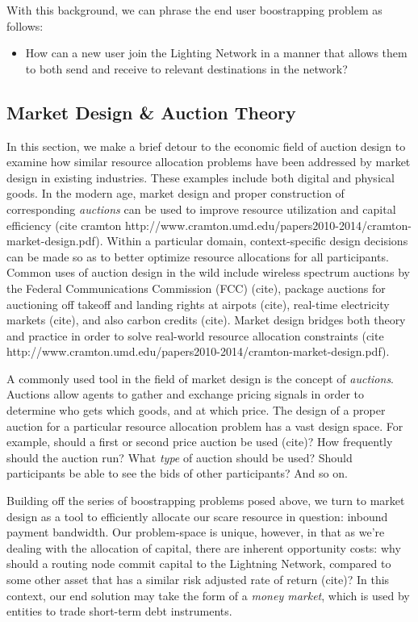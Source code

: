 \documentclass[10pt,a4paper]{article}
\theoremstyle{definition}
\begin{document}
With this background, we can phrase the end user boostrapping problem as
follows: 

\begin{itemize}
        \item How can a new user join the Lighting Network in a manner that allows them to
            both send and receive to relevant destinations in the network? 
\end{itemize}


\subsection{Market Design \& Auction Theory}

In this section, we make a brief detour to the economic field of auction design
to examine how similar resource allocation problems have been addressed by
market design in existing industries. These examples include both digital and physical goods. In
the modern age, market design and proper construction of corresponding
\emph{auctions} can be used to improve resource utilization and capital
efficiency (cite cramton
http://www.cramton.umd.edu/papers2010-2014/cramton-market-design.pdf). 
Within a particular domain, context-specific
design decisions can be made so as to better optimize resource allocations for all
participants. Common uses of auction design in the wild include
wireless spectrum auctions by the Federal Communications Commission (FCC)
(cite), package auctions for auctioning off takeoff and landing rights at
airpots (cite), real-time electricity markets (cite), and also carbon credits
(cite). Market design bridges both theory and practice in order to solve
real-world resource allocation constraints (cite
http://www.cramton.umd.edu/papers2010-2014/cramton-market-design.pdf). 


A commonly used tool in the field of market design is the concept of \emph{auctions}.
Auctions allow agents to gather and exchange pricing signals in order to determine
who gets which goods, and at which price. The design of a proper auction for a
particular resource allocation problem has a vast design space. For example,
should a first or second price auction be used (cite)? How frequently should
the auction run? What \emph{type} of auction should be used? Should
participants be able to see the bids of other participants? And so on. 

Building off the series of boostrapping problems posed above, we turn to market
design as a tool to efficiently allocate our scare resource in question:
inbound payment bandwidth. Our problem-space is unique, however, in that as we're
dealing with the allocation of capital, there are inherent opportunity costs:
why should a routing node commit capital to the Lightning Network, compared to
some other asset that has a similar risk adjusted rate of return (cite)? In
this context, our end solution may take the form of a \emph{money market},
which is used by entities to trade short-term debt instruments. 
\end{document}
